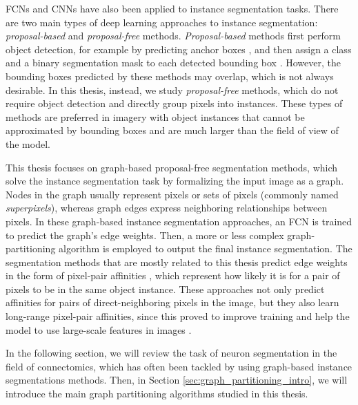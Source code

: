 FCNs and CNNs have also been applied to instance segmentation tasks.
There are two main types of deep learning approaches to instance segmentation: \emph{proposal-based} and \emph{proposal-free} methods. 
\emph{Proposal-based} methods first perform object detection, for example by predicting anchor boxes \cite{ren2015faster}, and then assign a class and a binary segmentation mask to each detected bounding box \cite{he2017mask,porzi2019seamless}.
However, the bounding boxes predicted by these methods may overlap, which is not always desirable. 
In this thesis, instead, we study \emph{proposal-free} methods, which do not require object detection and directly group pixels into instances. 
These types of methods are preferred in imagery with object instances that cannot be approximated by bounding boxes and are much larger than the field of view of the model. 

This thesis focuses on graph-based proposal-free segmentation methods, which solve the instance segmentation task by formalizing the input image as a graph. Nodes in the graph usually represent pixels or sets of pixels (commonly named \emph{superpixels}), whereas graph edges express neighboring relationships between pixels. In these graph-based instance segmentation approaches, an FCN is trained to predict the graph's edge weights. Then, a more or less complex graph-partitioning algorithm is employed to output the final instance segmentation. 
The segmentation methods that are mostly related to this thesis predict edge weights in the form of pixel-pair affinities \cite{Gao_2019_ICCV,liu2018affinity,lee2017superhuman}, which represent how likely it is for a pair of pixels to be in the same object instance. These approaches not only predict affinities for pairs of direct-neighboring pixels in the image, but they also learn long-range pixel-pair affinities, since this proved to improve training and help the model to use large-scale features in images \cite{lee2017superhuman}.

In the following section, we will review the task of neuron segmentation in the field of connectomics, which has often been tackled by using graph-based instance segmentations methods. Then, in Section \ref{sec:graph_partitioning_intro}, we will introduce the main graph partitioning algorithms studied in this thesis.





